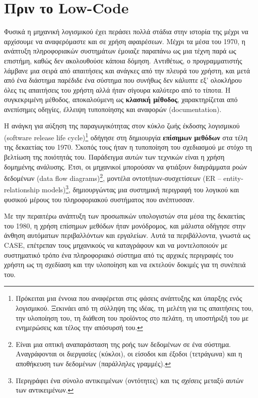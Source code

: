     \section{Πριν το Low-Code}
        Φυσικά η μηχανική λογισμικού έχει περάσει πολλά στάδια στην ιστορία της μέχρι να αρχίσουμε να αναφερόμαστε και σε χρήση αφαιρέσεων. Μέχρι τα μέσα του 1970, η ανάπτυξη πληροφοριακών συστημάτων έμοιαζε παραπάνω ως μια τέχνη παρά ως επιστήμη, καθώς δεν ακολουθούσε κάποια δόμηση. Αντιθέτως, ο προγραμματιστής λάμβανε μια σειρά από απαιτήσεις και ανάγκες από την πλευρά του χρήστη, και μετά από ένα διάστημα παρέδιδε ένα σύστημα που συνήθως δεν κάλυπτε εξ' ολοκλήρου όλες τις απαιτήσεις του χρήστη αλλά ήταν σίγουρα καλύτερο από το τίποτα. Η συγκεκριμένη μέθοδος, αποκαλούμενη ως \textbf{κλασική μέθοδος}, χαρακτηρίζεται από ανεπίσημες οδηγίες, έλλειψη τυποποίησης και αναφορών (documentation).

        Η ανάγκη για αύξηση της παραγωγικότητας στον κύκλο ζωής έκδοσης λογισμικού (software release life cycle)\footnote{Πρόκειται μια έννοια που αναφέρεται στις φάσεις ανάπτυξης και ύπαρξης ενός λογισμικού. Ξεκινάει από τη σύλληψη της ιδέας, τη μελέτη για τις απαιτήσεις του, την υλοποίηση του, τη διάθεση του προϊόντος στο πελάτη, τη υποστήριξή του με ενημερώσεις και τέλος την απόσυρσή του.} οδήγησε στη δημιουργία \textbf{επίσημων μεθόδων} στα τέλη της δεκαετίας του 1970. Σκοπός τους ήταν η τυποποίηση του σχεδιασμού με στόχο τη βελτίωση της ποιότητάς του. Παράδειγμα αυτών των τεχνικών είναι η χρήση δομημένης ανάλυσης. Έτσι, οι μηχανικοί μπορούσαν να φτιάξουν διαγράμματα ροών δεδομένων (data flow diagrams)\footnote{Είναι μια οπτική αναπαράσταση της ροής των δεδομένων σε ένα σύστημα. Αναγράφονται οι διεργασίες (κύκλοι), οι είσοδοι και έξοδοι (τετράγωνα) και η αποθήκευση των δεδομένων (παράλληλες γραμμές).}, μοντέλα οντοτήτων-συσχετίσεων (ER -- entity-relationship models)\footnote{Περιγράφει ένα σύνολο αντικειμένων (οντότητες) και τις \textit{σχέσεις} μεταξύ αυτών των αντικειμένων.}, δημιουργώντας μια συστημική περιγραφή του λογικού και φυσικού μέρους του πληροφοριακού συστήματος που ανέπτυσσαν.

        Με την περαιτέρω ανάπτυξη των προσωπικών υπολογιστών στα μέσα της δεκαετίας του 1980, η χρήση επίσημων μεθόδων ήταν μονόδρομος, και μάλιστα οδήγησε στην άνθηση αυτόματων περιβαλλόντων και εργαλείων. Αυτά τα περιβάλλοντα, γνωστά ως CASE, επέτρεπαν τους μηχανικούς να καταγράφουν και να μοντελοποιούν με συστηματικό τρόπο ένα πληροφοριακό σύστημα από τις αρχικές περιγραφές του χρήστη ως τη σχεδίαση και την υλοποίηση και να εκτελούν δοκιμές για τη συνέπειά του. \cite{CASEChikofsky}

